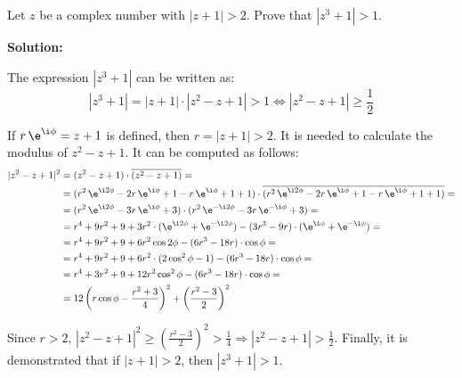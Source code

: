 \documentclass[../../main.tex]{subfiles}
\begin{document}
  \begin{shaded}
    Let $z$ be a complex number with $|z + 1| > 2$. Prove that $|z^3 + 1| > 1$.
  \end{shaded}

  \textbf{Solution:}

  The expression $|z^3 + 1|$ can be written as:
  $$
  |z^3 + 1| = |z + 1| \cdot |z^2 - z + 1| > 1 \iff |z^2 - z + 1| \geq \frac{1}{2}
  $$

  If $r \, \e^{\i\phi} = z + 1$ is defined, then $r = |z + 1| > 2$. It is needed to calculate the modulus of $z^2 - z + 1$. It can be computed as follows:
  \begin{equation*}
    \begin{split}
      |z^2 - z + 1|^2 & =
      (z^2 - z + 1) \cdot \overline{(z^2 - z + 1)} = \\ & =
      (r^2 \, \e^{\i2\phi} - 2r \, \e^{\i\phi} + 1 - r \, \e^{\i\phi} + 1 + 1) \cdot \overline{(r^2 \, \e^{\i2\phi} - 2r \, \e^{\i\phi} + 1 - r \, \e^{\i\phi} + 1 + 1)} = \\ & =
      (r^2 \, \e^{\i2\phi} - 3r \, \e^{\i\phi} + 3) \cdot (r^2 \, \e^{-\i2\phi} - 3r \, \e^{-\i\phi} + 3) = \\ & =
      r^4 + 9 r^2 + 9 + 3 r^2 \cdot (\e^{\i 2 \phi} + \e^{-\i 2 \phi}) - (3 r^3 - 9 r) \cdot (\e^{\i \phi} + \e^{-\i \phi}) = \\ & =
      r^4 + 9 r^2 + 9 + 6 r^2 \cos{2 \phi} - (6 r^3 -18 r) \cdot \cos{\phi} = \\ & =
      r^4 + 9 r^2 + 9 + 6 r^2 \cdot (2\cos^2{\phi} - 1) - (6 r^3 -18 r) \cdot \cos{\phi} = \\ & =
      r^4 + 3 r^2 + 9 + 12 r^2 \cos^2{\phi} - (6 r^3 -18 r) \cdot \cos{\phi} = \\ & =
      12 \left(r \cos{\phi} - \frac{r^2 + 3}{4}\right)^2 + \left(\frac{r^2 - 3}{2}\right)^2
    \end{split}
  \end{equation*}

  Since $r > 2$, $|z^2 - z + 1|^2 \geq \left(\displaystyle\frac{r^2 - 3}{2}\right)^2 > \displaystyle\frac{1}{4} \Longrightarrow |z^2 - z + 1| > \displaystyle\frac{1}{2}$. Finally, it is demonstrated that if $|z + 1| > 2$, then $|z^3 + 1| > 1$.
\end{document}
